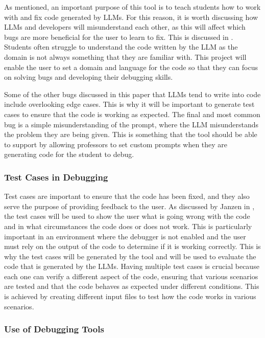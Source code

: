 \documentclass[12pt]{extarticle}
\begin{document}
As mentioned, an important purpose of this tool is to teach students how to work with and fix code generated by LLMs. For this reason, it is worth discussing how LLMs and developers will misunderstand each other, as this will affect which bugs are more beneficial for the user to learn to fix. This is discussed in \cite{nguyen2024}. Students often struggle to understand the code written by the LLM as the domain is not always something that they are familiar with. This project will enable the user to set a domain and language for the code so that they can focus on solving bugs and developing their debugging skills. 

Some of the other bugs discussed in this paper that LLMs tend to write into code include overlooking edge cases. This is why it will be important to generate test cases to ensure that the code is working as expected. The final and most common bug is a simple misunderstanding of the prompt, where the LLM misunderstands the problem they are being given. This is something that the tool should be able to support by allowing professors to set custom prompts when they are generating code for the student to debug.

\subsubsection{Test Cases in Debugging}

Test cases are important to ensure that the code has been fixed, and they also serve the purpose of providing feedback to the user. As discussed by Janzen in \cite{Janzen2008}, the test cases will be used to show the user what is going wrong with the code and in what circumstances the code does or does not work. This is particularly important in an environment where the debugger is not enabled and the user must rely on the output of the code to determine if it is working correctly. This is why the test cases will be generated by the tool and will be used to evaluate the code that is generated by the LLMs. Having multiple test cases is crucial because each one can verify a different aspect of the code, ensuring that various scenarios are tested and that the code behaves as expected under different conditions. This is achieved by creating different input files to test how the code works in various scenarios.

\subsubsection{Use of Debugging Tools}
\end{document}
